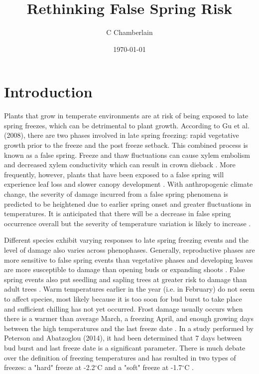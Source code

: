 \documentclass{article}\usepackage[]{graphicx}\usepackage[]{color}
\begin{document}
\title{Rethinking False Spring Risk}
\author{C Chamberlain}
\date{\today}
\maketitle 

\renewcommand{\thetable}{\arabic{table}}
\renewcommand{\thefigure}{\arabic{figure}}
\renewcommand{\labelitemi}{$-$}

\section*{Introduction}
Plants that grow in temperate environments are at risk of being exposed to late spring freezes, which can be detrimental to plant growth. According to Gu et al. (2008), there are two phases involved in late spring freezing: rapid vegetative growth prior to the freeze and the post freeze setback. This combined process is known as a false spring. Freeze and thaw fluctuations can cause xylem embolism and decreased xylem conductivity which can result in crown dieback \citep{Gu2008}.
More frequently, however, plants that have been exposed to a false spring will experience leaf loss and slower canopy development \citep{Hufkens2012}. 
With anthropogenic climate change, the severity of damage incurred from a false spring phenomena is predicted to be heightened due to earlier spring onset and greater fluctuations in temperatures. It is anticipated that there will be a decrease in false spring occurrence overall but the severity of temperature variation is likely to increase \citep{Allstadt2015}. 

Different species exhibit varying responses to late spring freezing events and the level of damage also varies across phenophases. Generally, reproductive phases are more sensitive to false spring events than vegetative phases and developing leaves are more susceptible to damage than opening buds or expanding shoots \citep{Peterson2014}. %
False spring events also put seedling and sapling trees at greater risk to damage than adult trees \citep{Vitasse2014}. 
Warm temperatures earlier in the year (i.e. in February) do not seem to affect species, most likely because it is too soon for bud burst to take place and sufficient chilling has not yet occurred. Frost damage usually occurs when there is a warmer than average March, a freezing April, and enough growing days between the high temperatures and the last freeze date \citep{Augspurger2013}. 
In a study performed by Peterson and Abatzoglou (2014), it had been determined that 7 days between bud burst and last freeze date is a significant parameter. There is much debate over the definition of freezing temperatures and has resulted in two types of freezes: a "hard" freeze at -2.2$^{\circ}$C and a "soft" freeze at -1.7$^{\circ}$C \citep{Augspurger2013, Kodra2011, Vavrus2006}.
\end{document}
